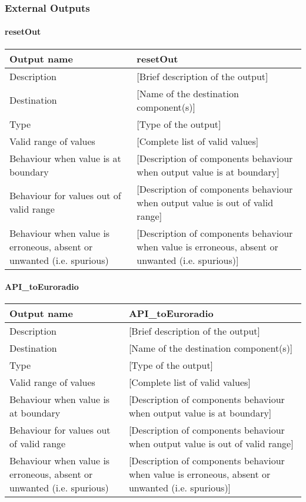 \subsubsection{External Outputs}

\paragraph{resetOut}

\begin{longtable}{p{}p{}}
\toprule
Output name				& resetOut \\
\midrule
Description				& [Brief description of the output] \\
\midrule
Destination				& [Name of the destination component(s)] \\ 
\midrule
Type					& [Type of the output] \\
\midrule
Valid range of values	& [Complete list of valid values] \\
\midrule
Behaviour when value is at boundary	& [Description of components behaviour when output value is at boundary] \\
\midrule
Behaviour for values out of valid range	& [Description of components behaviour when output value is out of valid range] \\
\midrule
Behaviour when value is erroneous, absent or unwanted (i.e. spurious) & [Description of components behaviour when value is erroneous, absent or unwanted (i.e. spurious)] \\
\bottomrule
\end{longtable}


\paragraph{API\_toEuroradio}

\begin{longtable}{p{}p{}}
\toprule
Output name				& API\_toEuroradio \\
\midrule
Description				& [Brief description of the output] \\
\midrule
Destination				& [Name of the destination component(s)] \\ 
\midrule
Type					& [Type of the output] \\
\midrule
Valid range of values	& [Complete list of valid values] \\
\midrule
Behaviour when value is at boundary	& [Description of components behaviour when output value is at boundary] \\
\midrule
Behaviour for values out of valid range	& [Description of components behaviour when output value is out of valid range] \\
\midrule
Behaviour when value is erroneous, absent or unwanted (i.e. spurious) & [Description of components behaviour when value is erroneous, absent or unwanted (i.e. spurious)] \\
\bottomrule
\end{longtable}


